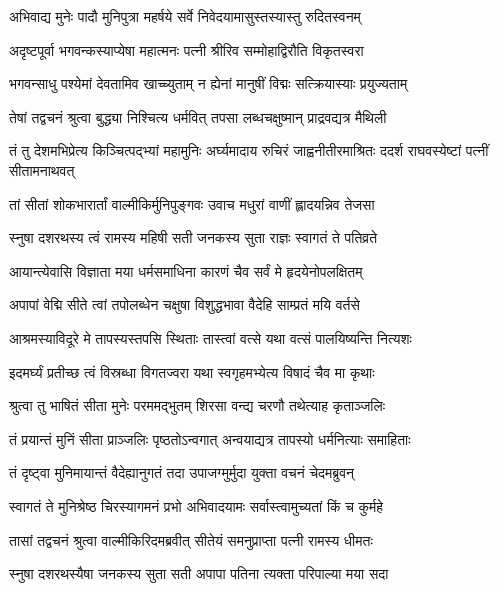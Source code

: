 \twolineshloka
{अभिवाद्य मुनेः पादौ मुनिपुत्रा महर्षये}
{सर्वे निवेदयामासुस्तस्यास्तु रुदितस्वनम्} %

\twolineshloka
{अदृष्टपूर्वा भगवन्कस्याप्येषा महात्मनः}
{पत्नी श्रीरिव सम्मोहाद्विरौति विकृतस्वरा} %

\twolineshloka
{भगवन्साधु पश्येमां देवतामिव खाच्च्युताम्}
{न ह्येनां मानुषीं विद्मः सत्क्रियास्याः प्रयुज्यताम्} %

\twolineshloka
{तेषां तद्वचनं श्रुत्वा बुद्ध्या निश्चित्य धर्मवित्}
{तपसा लब्धचक्षुष्मान् प्राद्रवद्यत्र मैथिली} %

\threelineshloka
{तं तु देशमभिप्रेत्य किञ्चित्पद्भ्यां महामुनिः}
{अर्घ्यमादाय रुचिरं जाह्वनीतीरमाश्रितः}
{ददर्श राघवस्येष्टां पत्नीं सीतामनाथवत्} %

\twolineshloka
{तां सीतां शोकभारार्तां वाल्मीकिर्मुनिपुङ्गवः}
{उवाच मधुरां वाणीं ह्लादयन्निव तेजसा} %

\twolineshloka
{स्नुषा दशरथस्य त्वं रामस्य महिषी सती}
{जनकस्य सुता राज्ञः स्वागतं ते पतिव्रते} %

\twolineshloka
{आयान्त्येवासि विज्ञाता मया धर्मसमाधिना}
{कारणं चैव सर्वं मे हृदयेनोपलक्षितम्} %

\twolineshloka
{अपापां वेद्मि सीते त्वां तपोलब्धेन चक्षुषा}
{विशुद्धभावा वैदेहि साम्प्रतं मयि वर्तसे} %

\twolineshloka
{आश्रमस्याविदूरे मे तापस्यस्तपसि स्थिताः}
{तास्त्वां वत्से यथा वत्सं पालयिष्यन्ति नित्यशः} %

\twolineshloka
{इदमर्घ्यं प्रतीच्छ त्वं विस्रब्धा विगतज्वरा}
{यथा स्वगृहमभ्येत्य विषादं चैव मा कृथाः} %

\twolineshloka
{श्रुत्वा तु भाषितं सीता मुनेः परममद्भुतम्}
{शिरसा वन्द्य चरणौ तथेत्याह कृताञ्जलिः} %

\twolineshloka
{तं प्रयान्तं मुनिं सीता प्राञ्जलिः पृष्ठतोऽन्वगात्}
{अन्वयाद्यत्र तापस्यो धर्मनित्याः समाहिताः} %

\twolineshloka
{तं दृष्ट्वा मुनिमायान्तं वैदेह्यानुगतं तदा}
{उपाजग्मुर्मुदा युक्ता वचनं चेदमब्रुवन्} %

\twolineshloka
{स्वागतं ते मुनिश्रेष्ठ चिरस्यागमनं प्रभो}
{अभिवादयामः सर्वास्त्वामुच्यतां किं च कुर्महे} %

\twolineshloka
{तासां तद्वचनं श्रुत्वा वाल्मीकिरिदमब्रवीत्}
{सीतेयं समनुप्राप्ता पत्नी रामस्य धीमतः} %

\twolineshloka
{स्नुषा दशरथस्यैषा जनकस्य सुता सती}
{अपापा पतिना त्यक्ता परिपाल्या मया सदा} %

